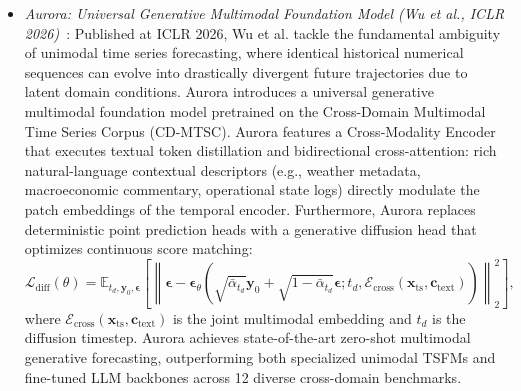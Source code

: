 \begin{itemize}[leftmargin=*]
    \item \emph{Aurora: Universal Generative Multimodal Foundation Model (Wu et al., ICLR 2026)}~\cite{wu2026aurora}: Published at ICLR 2026, Wu et al. tackle the fundamental ambiguity of unimodal time series forecasting, where identical historical numerical sequences can evolve into drastically divergent future trajectories due to latent domain conditions. Aurora introduces a universal generative multimodal foundation model pretrained on the Cross-Domain Multimodal Time Series Corpus (CD-MTSC). Aurora features a Cross-Modality Encoder that executes textual token distillation and bidirectional cross-attention: rich natural-language contextual descriptors (e.g., weather metadata, macroeconomic commentary, operational state logs) directly modulate the patch embeddings of the temporal encoder. Furthermore, Aurora replaces deterministic point prediction heads with a generative diffusion head that optimizes continuous score matching:
    \begin{equation}
        \mathcal{L}_{\text{diff}}(\theta) = \mathbb{E}_{t_d, \mathbf{y}_0, \boldsymbol{\epsilon}} \left[ \left\| \boldsymbol{\epsilon} - \boldsymbol{\epsilon}_\theta\left(\sqrt{\bar{\alpha}_{t_d}} \mathbf{y}_0 + \sqrt{1 - \bar{\alpha}_{t_d}} \boldsymbol{\epsilon}; t_d, \mathcal{E}_{\text{cross}}(\mathbf{x}_{\text{ts}}, \mathbf{c}_{\text{text}})\right) \right\|_2^2 \right],
    \end{equation}
    where $\mathcal{E}_{\text{cross}}(\mathbf{x}_{\text{ts}}, \mathbf{c}_{\text{text}})$ is the joint multimodal embedding and $t_d$ is the diffusion timestep. Aurora achieves state-of-the-art zero-shot multimodal generative forecasting, outperforming both specialized unimodal TSFMs and fine-tuned LLM backbones across 12 diverse cross-domain benchmarks.
\end{itemize}



